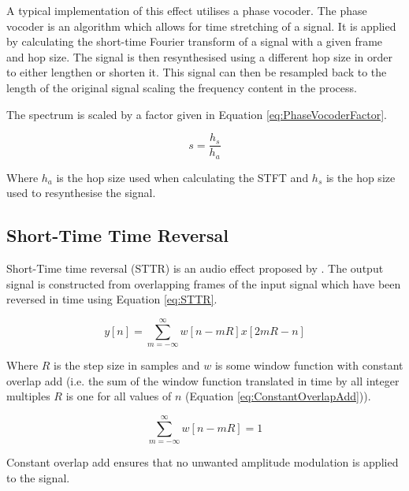 		A typical implementation of this effect utilises a phase vocoder. The phase vocoder is an algorithm which
		allows for time stretching of a signal. It is applied by calculating the short-time Fourier transform of a
		signal with a given frame and hop size. The signal is then resynthesised using a different hop size in
		order to either lengthen or shorten it. This signal can then be resampled back to the length of the
		original signal scaling the frequency content in the process. 
		
		The spectrum is scaled by a factor given in Equation \ref{eq:PhaseVocoderFactor}.

		\begin{equation}
			s = \frac{h_{s}}{h_{a}}
			\label{eq:PhaseVocoderFactor}
		\end{equation}

		Where $h_{a}$ is the hop size used when calculating the STFT and $h_{s}$ is the hop size used to
		resynthesise the signal.

	\subsection{Short-Time Time Reversal}
	\label{sec:Excitation-Methods-STTR}
		Short-Time time reversal (STTR) is an audio effect proposed by \citet{kim2014shorttime}. The output signal
		is constructed from overlapping frames of the input signal which have been reversed in time using Equation
		\ref{eq:STTR}.

		\begin{equation}
			y[n] = \sum_{m = -\infty}^{\infty} w[n - mR]x[2mR - n]
			\label{eq:STTR}
		\end{equation}

		Where $R$ is the step size in samples and $w$ is some window function with constant overlap add (i.e. the
		sum of the window function translated in time by all integer multiples $R$ is one for all values of $n$
		(Equation \ref{eq:ConstantOverlapAdd})).

		\begin{equation}
			\sum_{m = -\infty}^{\infty} w[n - mR] = 1
			\label{eq:ConstantOverlapAdd}
		\end{equation}

		Constant overlap add ensures that no unwanted amplitude modulation is applied to the signal.

